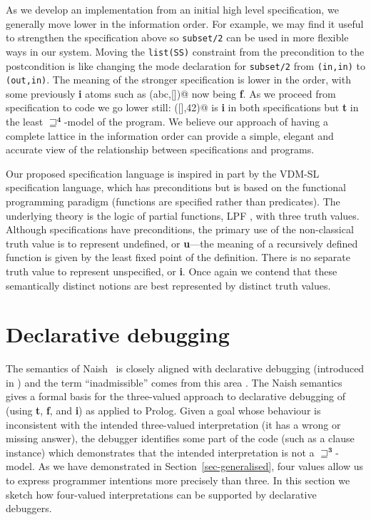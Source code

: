 \documentclass{tlp}
\newcommand{\Tri}{\ensuremath{\mathbf{3}}}
\newcommand{\Quad}{\ensuremath{\mathbf{4}}}
\begin{document}
As we develop an implementation from an initial high level specification,
we generally move lower in the information order.  For example,
we may find it useful to strengthen the specification above so
\texttt{subset/2} can be used in more flexible ways in our system.
Moving the \texttt{list(SS)} constraint from the precondition to the
postcondition is like changing the mode declaration for \texttt{subset/2}
from \texttt{(in,in)} to \texttt{(out,in)}.  The meaning of the
stronger specification is lower in the order, with some previously
\textbf{i} atoms such as \verb@subset(abc,[])@ now being \textbf{f}.  As we
proceed from specification to code we go lower still: \verb@subset([],42)@
is \textbf{i} in both specifications but \textbf{t} in the least
$\sqsupseteq^\Quad$-model of the program.  We believe our approach of
having a complete lattice in the information order can provide a simple,
elegant and accurate view of the relationship between specifications
and programs.

Our proposed specification language is inspired in part by the VDM-SL
specification language, which has preconditions but is based on the
functional programming paradigm (functions are specified rather than
predicates).  The underlying theory is the logic of partial functions, 
LPF \cite{barringer-cheng-cbjones:1984,jones_middelburg}, 
with three truth values.  Although specifications
have preconditions, the primary use of the non-classical truth value
is to represent undefined, or \textbf{u}---the meaning of a recursively
defined function is given by the least fixed point of the definition.
There is no separate truth value to represent unspecified, or \textbf{i}.  
Once again we contend that these semantically distinct notions are 
best represented by distinct truth values.


\section{Declarative debugging}
\label{sec-debugging}

The semantics of Naish~\citeyear{sem3neg} is closely aligned with
declarative debugging (introduced in ) and the term
``inadmissible'' comes from this area \cite{Per86}.  The Naish semantics
gives a formal basis for the three-valued approach to declarative
debugging of  (using \textbf{t}, \textbf{f}, and
\textbf{i}) as applied to Prolog.  Given a goal whose behaviour
is inconsistent with the intended three-valued interpretation (it
has a wrong or missing answer), the debugger identifies some part
of the code (such as a clause instance) which demonstrates that the
intended interpretation is not a $\sqsupseteq^\Tri$-model.  As we have
demonstrated in Section~\ref{sec-generalised}, four values allow us
to express programmer intentions more precisely than three.  In this
section we sketch how four-valued interpretations can be supported by
declarative debuggers.
\end{document}
